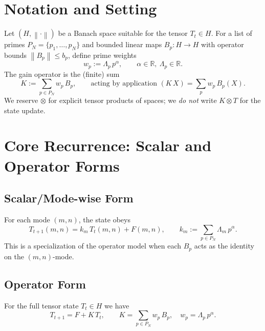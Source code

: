 \documentclass[11pt]{article}
\theoremstyle{plain}
\theoremstyle{definition}
\theoremstyle{remark}
\newcommand{\R}{\mathbb{R}}
\newcommand{\norm}[1]{\left\lVert #1 \right\rVert}
\begin{document}
\section{Notation and Setting}
Let $(H,\norm{\cdot})$ be a Banach space suitable for the tensor $T_t\in H$. For a list of primes $P_N=\{p_1,\dots,p_N\}$ and bounded linear maps $B_p:H\to H$ with operator bounds $\norm{B_p}\le b_p$, define prime weights
\[
  w_p := \Lambda_p\,p^{\alpha}, \qquad \alpha\in\R, \ \Lambda_p\in\R.
\]
The gain operator is the (finite) sum
\[
  K := \sum_{p\in P_N} w_p\,B_p, \qquad \text{acting by application } (K\,X)=\sum_{p} w_p\,B_p(X).
\]
We reserve $\otimes$ for explicit tensor products of spaces; we \emph{do not} write $K\otimes T$ for the state update.

\section{Core Recurrence: Scalar and Operator Forms}
\subsection{Scalar/Mode-wise Form}
For each mode $(m,n)$, the state obeys
\begin{equation}
  T_{t+1}(m,n) = k_m\,T_t(m,n) + F(m,n), \qquad k_m := \sum_{p\in P_N} \Lambda_m\, p^{\alpha}.
  \label{eq:scalar}
\end{equation}
This is a specialization of the operator model when each $B_p$ acts as the identity on the $(m,n)$-mode.

\subsection{Operator Form}
For the full tensor state $T_t\in H$ we have
\begin{equation}
  T_{t+1} = F + K\,T_t, \qquad K = \sum_{p\in P_N} w_p\,B_p, \quad w_p=\Lambda_p\,p^{\alpha}.
  \label{eq:operator}
\end{equation}
\end{document}
